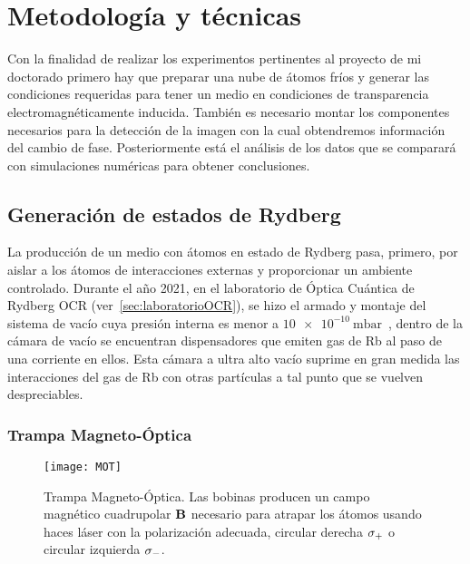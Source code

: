 \chapter{\label{cap:metodologiaTecnicas}Metodología y técnicas}

Con la finalidad de realizar los experimentos pertinentes al proyecto de mi doctorado primero hay que preparar una nube de átomos fríos y generar las condiciones requeridas para tener un medio en condiciones de transparencia electromagnéticamente inducida. También es necesario montar los componentes necesarios para la detección de la imagen con la cual obtendremos información del cambio de fase. Posteriormente está el análisis de los datos que se comparará con simulaciones numéricas para obtener conclusiones.

\section{\label{sec:generacionRydberg}Generación de estados de Rydberg}

La producción de un medio con átomos en estado de Rydberg pasa, primero, por aislar a los átomos de interacciones externas y proporcionar un ambiente controlado. Durante el año 2021, en el laboratorio de Óptica Cuántica de Rydberg OCR (ver~\ref{sec:laboratorioOCR}), se hizo el armado y montaje del sistema de vacío cuya presión interna es menor a $\SI{10e-10}{\milli\bar}$~\cite{alonso}, dentro de la cámara de vacío se encuentran dispensadores que emiten gas de Rb al paso de una corriente en ellos. Esta cámara a ultra alto vacío suprime en gran medida las interacciones del gas de Rb con otras partículas a tal punto que se vuelven despreciables.

\subsection{\label{sub:mot}Trampa Magneto-Óptica}

\begin{wrapfigure}{r}{0.45\textwidth}
\vspace{-2\baselineskip}
\centering
\begin{minipage}{0.42\textwidth}
\centering
\texttt{[image: MOT]}  
\caption[Esquema de una MOT]{\label{fig:mot}Trampa Magneto-Óptica. Las bobinas producen un campo magnético cuadrupolar $\text{\textbf{B}}$ necesario para atrapar los átomos usando haces láser con la polarización adecuada, circular derecha $\sigma_{+}$ o circular izquierda $\sigma_{-}$.}
\end{minipage}
\end{wrapfigure}

